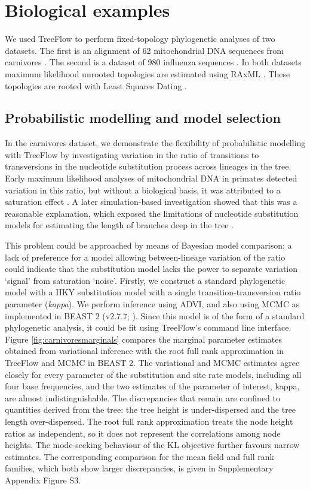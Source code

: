 \documentclass[oupdraft]{sysbio_sse}
\let\cite\citep
\begin{document}
\section{Biological examples}

We used TreeFlow to perform fixed-topology phylogenetic analyses of two datasets. The first is an alignment of 62 mitochondrial DNA sequences from carnivores \cite{suchard2009many}. The second is a dataset of 980 influenza sequences \cite{vaughan2014efficient}. In both datasets maximum likelihood unrooted topologies are estimated using RAxML \cite{stamatakis2014raxml}. These topologies are rooted with Least Squares Dating \cite{to2016lsd}.

\subsection{Probabilistic modelling and model selection}

In the carnivores dataset, we demonstrate the flexibility of probabilistic modelling with TreeFlow by investigating variation in the ratio of transitions to transversions in the nucleotide substitution process across lineages in the tree. Early maximum likelihood analyses of mitochondrial DNA in primates detected variation in this ratio, but without a biological basis, it was attributed to a saturation effect \cite{yang1999estimation}. A later simulation-based investigation showed that this was a reasonable explanation, which exposed the limitations of nucleotide substitution models for estimating the length of branches deep in the tree \cite{duchene2015declining}.


This problem could be approached by means of Bayesian model comparison; a lack of preference for a model allowing between-lineage variation of the ratio could indicate that the substitution model lacks the power to separate variation `signal' from saturation `noise'. Firstly, we construct a standard phylogenetic model with a HKY substitution model with a single transition-transversion ratio parameter (\textit{kappa}). We perform inference using ADVI, and also using MCMC as implemented in BEAST 2 (v2.7.7; \cite{bouckaert2019beast}). Since this model is of the form of a standard phylogenetic analysis, it could be fit using TreeFlow's command line interface. Figure \ref{fig:carnivoresmarginals} compares the marginal parameter estimates obtained from variational inference with the root full rank approximation in TreeFlow and MCMC in BEAST 2. The variational and MCMC estimates agree closely for every parameter of the substitution and site rate models, including all four base frequencies, and the two estimates of the parameter of interest, kappa, are almost indistinguishable. The discrepancies that remain are confined to quantities derived from the tree: the tree height is under-dispersed and the tree length over-dispersed. The root full rank approximation treats the node height ratios as independent, so it does not represent the correlations among node heights. The mode-seeking behaviour of the KL objective further favours narrow estimates. The corresponding comparison for the mean field and full rank families, which both show larger discrepancies, is given in Supplementary Appendix Figure S3.
\end{document}
